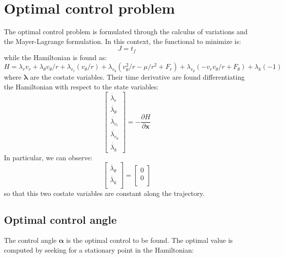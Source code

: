 \documentclass{report}
\begin{document}
\section*{Optimal control problem}
The optimal control problem is formulated through the calculus of variations and the Mayer-Lagrange formulation.
In this context, the functional to minimize is:
\begin{equation*}
    J = t_f
\end{equation*}
while the Hamiltonian is found as:
\begin{equation*}
    H = \lambda_r v_r + \lambda_{\theta} v_{\theta}/r + \lambda_{v_r} (v_{\theta}/r) + \lambda_{v_{\theta}} (v_{\theta}^2/r - \mu/r^2 + F_r) + \lambda_{v_{\theta}} (-v_r v_{\theta}/r + F_{\theta}) + \lambda_k(-1)
\end{equation*}
where $\boldsymbol{\lambda}$ are the costate variables.
Their time derivative are found differentiating the Hamiltonian with respect to the state variables:
\begin{equation*}
    \begin{bmatrix}
        \dot{\lambda_r} \\
        \dot{\lambda_{\theta}} \\
        \dot{\lambda_{v_r}} \\
        \dot{\lambda_{v_{\theta}}} \\
        \dot{\lambda_k}
    \end{bmatrix}
    =
    -\frac{\partial H}{\partial \boldsymbol{x}}
\end{equation*}
In particular, we can observe:
\begin{equation*}
    \begin{bmatrix}
        \dot{\lambda_{\theta}} \\
        \dot{\lambda_{k}} \\ 
    \end{bmatrix}
    = 
    \begin{bmatrix}
            0 \\
            0 \\
    \end{bmatrix}
\end{equation*}
so that this two costate variables are constant along the trajectory.
\subsection*{Optimal control angle}
The control angle $\boldsymbol{\alpha}$ is the optimal control to be found. The optimal value is computed by seeking for a stationary point in the Hamiltonian:
\end{document}
